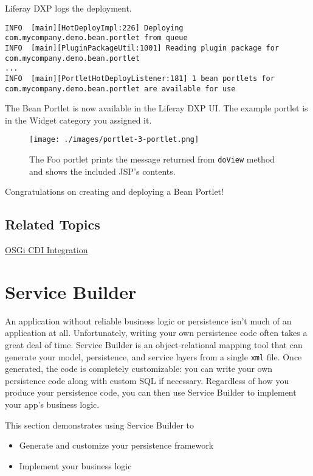 Liferay DXP logs the deployment.

\begin{verbatim}
INFO  [main][HotDeployImpl:226] Deploying com.mycompany.demo.bean.portlet from queue
INFO  [main][PluginPackageUtil:1001] Reading plugin package for com.mycompany.demo.bean.portlet
...
INFO  [main][PortletHotDeployListener:181] 1 bean portlets for com.mycompany.demo.bean.portlet are available for use
\end{verbatim}

The Bean Portlet is now available in the Liferay DXP UI. The example
portlet is in the Widget category you assigned it.

\begin{figure}
\centering
\texttt{[image: ./images/portlet-3-portlet.png]}
\caption{The Foo portlet prints the message returned from
\texttt{doView} method and shows the included JSP's contents.}
\end{figure}

Congratulations on creating and deploying a Bean Portlet!

\section{Related Topics}\label{related-topics-11}

\href{/docs/7-2/frameworks/-/knowledge_base/f/osgi-cdi-integration}{OSGi
CDI Integration}

\chapter{Service Builder}\label{service-builder}

An application without reliable business logic or persistence isn't much
of an application at all. Unfortunately, writing your own persistence
code often takes a great deal of time. Service Builder is an
object-relational mapping tool that can generate your model,
persistence, and service layers from a single \texttt{xml} file. Once
generated, the code is completely customizable: you can write your own
persistence code along with custom SQL if necessary. Regardless of how
you produce your persistence code, you can then use Service Builder to
implement your app's business logic.

This section demonstrates using Service Builder to

\begin{itemize}
\item
  Generate and customize your persistence framework
\item
  Implement your business logic
\end{itemize}

